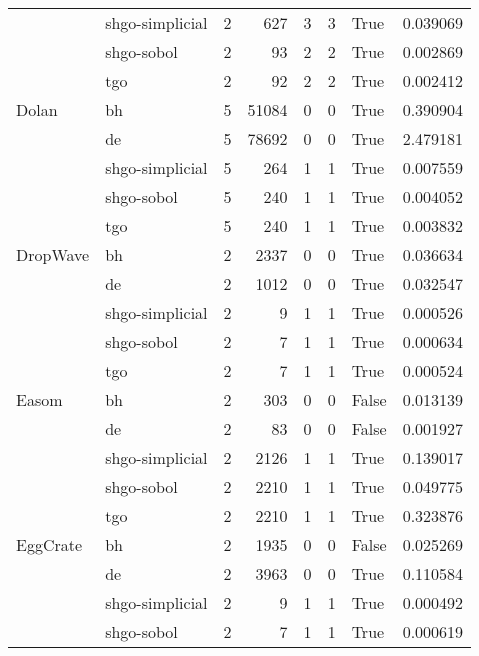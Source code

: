 \begin{longtable}{llrrrrlr}
         & shgo-simplicial &     2 &      627 &      3 &       3 &    True &    0.039069 \\
         & shgo-sobol &     2 &       93 &      2 &       2 &    True &    0.002869 \\
         & tgo &     2 &       92 &      2 &       2 &    True &    0.002412 \\
Dolan & bh &     5 &    51084 &      0 &       0 &    True &    0.390904 \\
         & de &     5 &    78692 &      0 &       0 &    True &    2.479181 \\
         & shgo-simplicial &     5 &      264 &      1 &       1 &    True &    0.007559 \\
         & shgo-sobol &     5 &      240 &      1 &       1 &    True &    0.004052 \\
         & tgo &     5 &      240 &      1 &       1 &    True &    0.003832 \\
DropWave & bh &     2 &     2337 &      0 &       0 &    True &    0.036634 \\
         & de &     2 &     1012 &      0 &       0 &    True &    0.032547 \\
         & shgo-simplicial &     2 &        9 &      1 &       1 &    True &    0.000526 \\
         & shgo-sobol &     2 &        7 &      1 &       1 &    True &    0.000634 \\
         & tgo &     2 &        7 &      1 &       1 &    True &    0.000524 \\
Easom & bh &     2 &      303 &      0 &       0 &   False &    0.013139 \\
         & de &     2 &       83 &      0 &       0 &   False &    0.001927 \\
         & shgo-simplicial &     2 &     2126 &      1 &       1 &    True &    0.139017 \\
         & shgo-sobol &     2 &     2210 &      1 &       1 &    True &    0.049775 \\
         & tgo &     2 &     2210 &      1 &       1 &    True &    0.323876 \\
EggCrate & bh &     2 &     1935 &      0 &       0 &   False &    0.025269 \\
         & de &     2 &     3963 &      0 &       0 &    True &    0.110584 \\
         & shgo-simplicial &     2 &        9 &      1 &       1 &    True &    0.000492 \\
         & shgo-sobol &     2 &        7 &      1 &       1 &    True &    0.000619 \\

\end{longtable}
